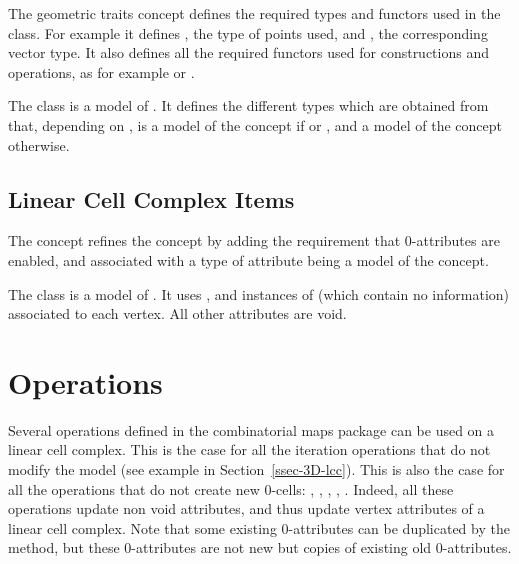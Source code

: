 The  geometric traits concept defines the
required types and functors used in the 
class. For example it defines , the type of points used,
and , the corresponding vector type.  It also defines all
the required functors used for constructions and operations, as for
example  or
.

The class  is a model of
. It defines the different types which
are obtained from  that, depending on , is a model of
the concept  if  or , and a model of
the concept  otherwise.


\subsection{Linear Cell Complex Items}\label{ssec-lcc-item}

The  concept refines the
 concept by adding the requirement that
0-attributes are enabled, and associated with a type of attribute
being a model of the  concept.  

The class  is a
model of . It uses ,
and instances of 
(which contain no information) associated to each vertex. All other
attributes are void.  

\section{Operations}

Several operations defined in the combinatorial maps package can be
used on a linear cell complex. This is the case for all the iteration
operations that do not modify the model (see example in 
Section~\ref{ssec-3D-lcc}). This is also the case for
all the operations that do not create new 0-cells: ,
, , ,
.  Indeed, all these operations update
non void attributes, and thus update vertex attributes of a linear
cell complex. Note that some existing 0-attributes can be duplicated
by the  method, but these 0-attributes are not new but
copies of existing old 0-attributes.

